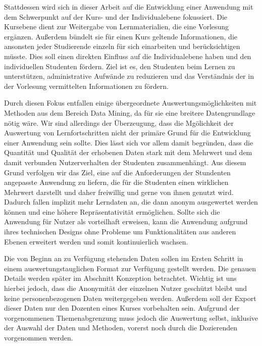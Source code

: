 Stattdessen wird sich in dieser Arbeit auf die Entwicklung einer Anwendung mit dem Schwerpunkt auf der Kurs- und der Individualebene fokussiert.
Die Kursebene dient zur Weitergabe von Lernmaterialien, die eine Vorlesung ergänzen. Außerdem bündelt sie für einen Kurs geltende Informationen, die ansonsten jeder Studierende einzeln für sich einarbeiten und berücksichtigen müsste. Dies soll einen direkten Einfluss auf die Individualebene haben und den individuellen Studenten fördern. Ziel ist es, den Studenten beim Lernen zu unterstützen, administrative Aufwände zu reduzieren und das Verständnis der in der Vorlesung vermittelten Informationen zu fördern.  

Durch diesen Fokus entfallen einige übergeordnete Auswertungsmöglichkeiten mit Methoden aus dem Bereich Data Mining, da für sie eine breitere Datengrundlage nötig wäre. Wir sind allerdings der Überzeugung, dass die Mgölichkeit der Auswertung von Lernfortschritten nicht der primäre Grund für die Entwicklung einer Anwendung sein sollte. Dies lässt sich vor allem damit begründen, dass die Quantität und Qualität der erhobenen Daten stark mit dem Mehrwert und dem damit verbunden Nutzerverhalten der Studenten zusammenhängt. Aus diesem Grund verfolgen wir das Ziel, eine auf die Anforderungen der Stundenten angepasste Anwendung zu liefern, die für die Studenten einen wirklichen Mehrwert darstellt und daher freiwillig und gerne von ihnen genutzt wird. Dadurch fallen implizit mehr Lerndaten an, die dann anonym ausgewertet werden können und eine höhere Repräsentativität ermöglichen. Sollte sich die Anwendung für Nutzer als vorteilhaft erweisen, kann die Anwendung aufgrund ihres technischen Designs ohne Probleme um Funktionalitäten aus anderen Ebenen erweitert werden und somit kontinuierlich wachsen.




Die von Beginn an zu Verfügung stehenden Daten sollen im Ersten Schritt in einem auswertungstauglichen Format zur Verfügung gestellt werden. Die genauen Details werden später im Abschnitt Konzeption betrachtet. Wichtig ist uns hierbei jedoch, dass die Anonymität der einzelnen Nutzer geschützt bleibt und keine personenbezogenen Daten weitergegeben werden. Außerdem soll der Export dieser Daten nur den Dozenten eines Kurses vorbehalten sein. Aufgrund der vorgenommenen Themenabgrenzung muss jedoch die Auswertung selbst, inklusive der Auswahl der Daten und Methoden, vorerst noch durch die Dozierenden vorgenommen werden. 

